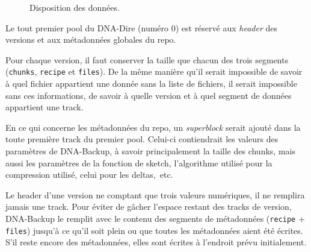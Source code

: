 \documentclass[a4paper]{report}
\begin{document}
\begin{figure}[ht]
\centering


\caption{Disposition des données.}
\label{fig:data-layout}
\end{figure}

Le tout premier pool du DNA-Dire (numéro 0) est réservé aux \emph{header} des versions
et aux métadonnées globales du repo.

Pour chaque version, il faut conserver la taille que chacun des trois segments
(\verb|chunks|, \verb|recipe| et \verb|files|).
De la même manière qu'il serait impossible de savoir
à quel fichier appartient une donnée sans la liste de fichiers,
il serait impossible sans ces informations, de savoir
à quelle version et à quel segment de données appartient une track.

En ce qui concerne les métadonnées du repo,
un \emph{superblock} serait ajouté dans la toute première track du premier pool.
Celui-ci contiendrait les valeurs des paramètres de DNA-Backup,
à savoir principalement la taille des chunks, mais aussi les paramètres de la fonction de sketch,
l'algorithme utilisé pour la compression utilisé, celui pour les deltas,~etc.

Le header d'une version ne comptant que trois valeurs numériques, il ne remplira jamais une track.
Pour éviter de gâcher l'espace restant des tracks de version,
DNA-Backup le remplit avec le contenu des segments de métadonnées (\verb|recipe| + \verb|files|)
jusqu'à ce qu'il soit plein ou que toutes les métadonnées aient été écrites.
S'il reste encore des métadonnées, elles sont écrites à l'endroit prévu initialement.
\end{document}
